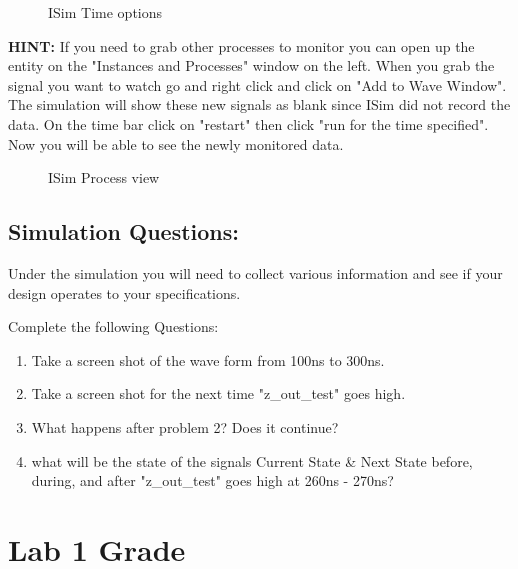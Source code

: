 \documentclass{article}
\begin{document}
\begin{figure}[!htb]
  \centering
  \caption{ISim Time options}
\end{figure}

\textbf{HINT:} If you need to grab other processes to monitor you can open up the entity on the "Instances and Processes" window on the left. When you grab the signal you want to watch go and right click and click on "Add to Wave Window". The simulation will show these new signals as blank since ISim did not record the data. On the time bar click on "restart" then click "run for the time specified". Now you will be able to see the newly monitored data.

\begin{figure}[!htb]
  \centering
  \caption{ISim Process view}
\end{figure}

\subsection{Simulation Questions:}

Under the simulation you will need to collect various information and see if your design operates to your specifications.

Complete the following Questions:

\begin{enumerate}
  \item Take a screen shot of the wave form from 100ns to 300ns.
  \item Take a screen shot for the next time "z\_out\_test" goes high.
  \item What happens after problem 2? Does it continue?
  \item what will be the state of the signals Current State \& Next State before, during, and after "z\_out\_test" goes high at 260ns - 270ns?
\end{enumerate}


\newpage

\section{Lab 1 Grade}
\end{document}
